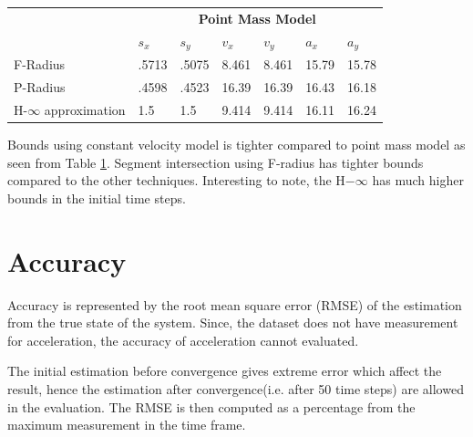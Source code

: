 \begin{table}[htbp]
\begin{tabular}{l l l l l l l}
		& \multicolumn{6}{c}{\textbf{Point Mass Model}}\\
		 & \textbf{$s_x$} & \textbf{$s_y$} & \textbf{$v_x$} & \textbf{$v_y$} & \textbf{$a_x$} & \textbf{$a_y$}\\ \midrule
		F-Radius & .5713 &	.5075 &	8.461	& 8.461 &	15.79 &	15.78\\
		P-Radius & .4598 &	.4523 &	16.39 &	16.39 &	16.43 &	16.18\\
		H-$\infty$ approximation & 1.5 & 1.5 & 9.414 &	9.414 &	16.11 &	16.24\\
		\bottomrule
	\end{tabular}
	\label{tab:bound}
\end{table}
Bounds using constant velocity model is tighter compared to point mass model as seen from Table \ref{tab:bound}. Segment intersection using F-radius has tighter bounds compared to the other techniques. Interesting to note, the H$-\infty$ has much higher bounds in the initial time steps.


\section{Accuracy}
Accuracy is represented by the root mean square error (RMSE) of the estimation from the true state of the system. Since, the dataset does not have measurement for acceleration, the accuracy of acceleration cannot evaluated.

The initial estimation before convergence gives extreme error which affect the result, hence the estimation after convergence(i.e. after 50 time steps) are allowed in the evaluation. The RMSE is then computed as a percentage from the maximum measurement in the time frame.

